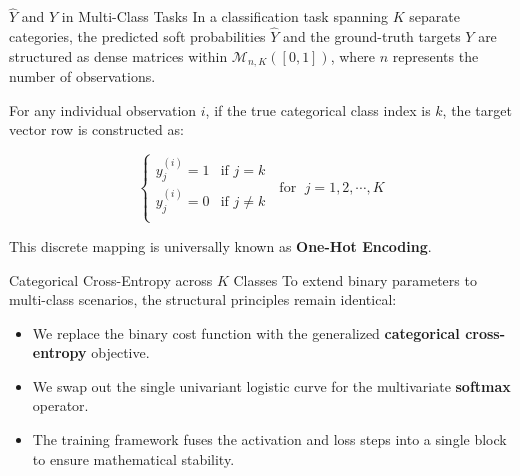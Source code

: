 \begin{frame}{$\hat{Y}$ and $Y$ in Multi-Class Tasks}
	In a classification task spanning $K$ separate categories, the predicted soft probabilities $\hat{Y}$ and the ground-truth targets $Y$ are structured as dense matrices within $\mathcal{M}_{n, K}([0, 1])$, where $n$ represents the number of observations.
	
	\pause
	\vspace{0.5cm}
	
	For any individual observation $i$, if the true categorical class index is $k$, the target vector row is constructed as:
	
	\begin{equation*}
		\begin{cases}
			y_{j}^{(i)} = 1 & \text{if } j = k \\
			y_{j}^{(i)} = 0 & \text{if } j \ne k \\
		\end{cases} \; \text{ for } \; j = 1, 2, \cdots, K
	\end{equation*}
	
	\vspace{0.5cm}
	\pause
	
	This discrete mapping is universally known as \textbf{One-Hot Encoding}.
\end{frame}

\begin{frame}{Categorical Cross-Entropy across $K$ Classes}
	To extend binary parameters to multi-class scenarios, the structural principles remain identical:
	\begin{itemize}
		\item We replace the binary cost function with the generalized \textbf{categorical cross-entropy} objective.
		\item We swap out the single univariant logistic curve for the multivariate \textbf{softmax} operator.
		\item The training framework fuses the activation and loss steps into a single block to ensure mathematical stability.
	\end{itemize}
\end{frame}

